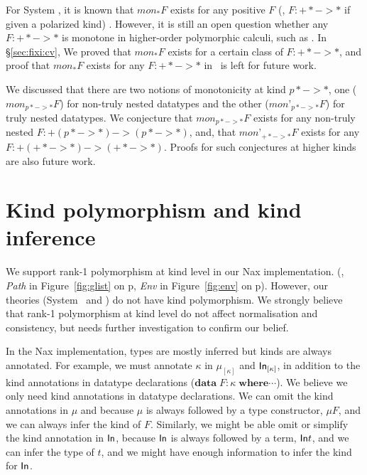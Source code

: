 For System \F, it is known that $mon_{*}F$ exists for any positive $F$
(\ie, $F:+* -> *$ if given a polarized kind) \cite{Mat99}. However,
it is still an open question whether any $F:+* -> *$ is monotone
in higher-order polymorphic calculi, such as \Fixi. In \S\ref{sec:fixi:cv},
We proved that $mon_{*}F$ exists for a certain class of $F:+* -> *$,
and proof that $mon_{*}F$ exists for any $F:+* -> *$ in \Fixi\ is
left for future work.

We discussed that there are two notions of monotonicity at kind $p* -> *$,
one ($\textit{mon}_{p* -> *}F$) for non-truly nested datatypes and
the other ($\textit{mon'}_{p* -> *}F$) for truly nested datatypes.
We conjecture that $\textit{mon}_{p* -> *}F$ exists for any non-truly nested
$F:+(p* -> *) -> (p* -> *)$, and, that $\textit{mon'}_{+* -> *}F$ exists
for any $F:+(+* -> *) -> (+* -> *)$. Proofs for such conjectures
at higher kinds are also future work.

\section{Kind polymorphism and kind inference}\label{sec:futwork:kindpoly}
We support rank-1 polymorphism at kind level in our Nax implementation.
(\eg, \textit{Path} in Figure~\ref{fig:glist} on p\pageref{fig:glist},
      \textit{Env} in Figure~\ref{fig:env} on p\pageref{fig:env}).
However, our theories (System \Fi\ and \Fixi) do not have kind polymorphism.
We strongly believe that rank-1 polymorphism at kind level do not affect
normalisation and consistency, but needs further investigation to confirm
our belief.

In the Nax implementation, types are mostly inferred but kinds are always
annotated. For example, we must annotate $\kappa$ in $\mu_{[\kappa]}$ and
$\mathsf{In}_{[\kappa]}$, in addition to the kind annotations in datatype declarations
($\mathbf{data}\;F : \kappa\;\mathbf{where} \cdots$).
We believe we only need kind annotations in datatype declarations.
We can omit the kind annotations in $\mu$ and because $\mu$ is always
followed by a type constructor, $\mu F$, and we can always infer
the kind of $F$. Similarly, we might be able omit or simplify
the kind annotation in $\mathsf{In}$, because $\mathsf{In}$ is always followed by a term,
$\mathsf{In} t$, and we can infer the type of $t$, and we might have
enough information to infer the kind for $\mathsf{In}$.

